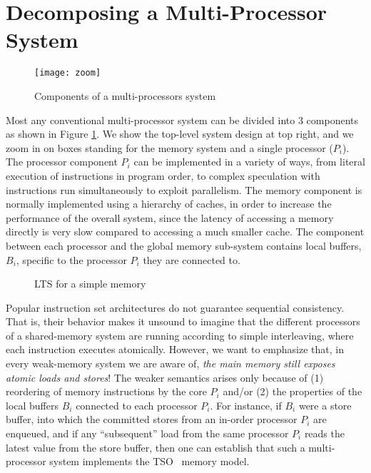 \section{Decomposing a Multi-Processor System}
\label{sec:store-atomicity}

\begin{figure}
\centering
\texttt{[image: zoom]}
\caption{Components of a multi-processors system}
\label{zoom}
\end{figure}

Most any conventional multi-processor system can be divided into 3 components as shown in
Figure \ref{zoom}. 
We show the top-level system design at top right, and we zoom in on boxes standing for the
memory system and a single processor ($P_i$).
The processor component $P_i$ can be implemented in a
variety of ways, from literal execution of instructions in program order, to complex speculation
with instructions run simultaneously to exploit parallelism. The memory component is normally implemented
using a hierarchy of caches, in order to increase the performance of the
overall system, since the latency of accessing a memory directly is very slow
compared to accessing a much smaller cache. The component between each
processor and the global memory sub-system contains local buffers, $B_i$, specific to
the processor $P_i$ they are connected to. 

\begin{figure}
\small
\centering
\begin{boxedminipage}[c]{.48\textwidth}
\inference
[Load]
{}
{}

\inference
[Store]
{}
{}

\end{boxedminipage}
\caption{LTS for a simple memory}
\label{$M_m$}
\end{figure}

Popular instruction set architectures do not guarantee sequential
consistency.  That is, their behavior makes it unsound to imagine that
the different processors of a shared-memory system are running
according to simple interleaving, where each instruction executes
atomically.  However, we want to emphasize that, in every weak-memory
system we are aware of, \emph{the main memory still exposes atomic
  loads and stores}!  The weaker semantics arises only because of (1)
reordering of memory instructions by the core $P_i$ and/or (2) the
properties of the local buffers $B_i$ connected to each processor
$P_i$.  For instance, if $B_i$ were a store buffer, into which the
committed stores from an in-order processor $P_i$ are enqueued, and if
any ``subsequent'' load from the same processor $P_i$ reads the latest
value from the store buffer, then one can establish that such a
multi-processor system implements the TSO~\cite{x86tsocacm10} memory
model.

